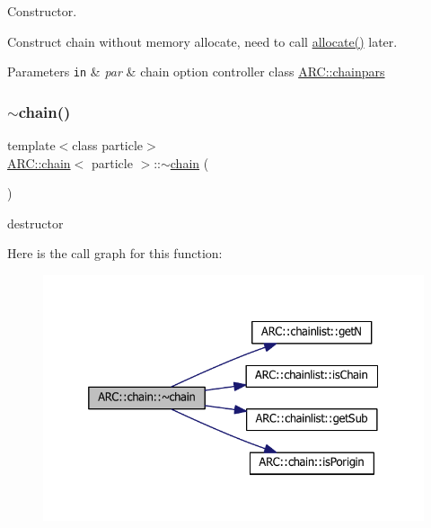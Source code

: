 Constructor. 

Construct chain without memory allocate, need to call \hyperlink{classARC_1_1chain_ad0abd7b957e9d88ad2f1823f06d28a4a}{allocate()} later. 
\begin{DoxyParams}[1]{Parameters}
\mbox{\tt in}  & {\em par} & chain option controller class \hyperlink{classARC_1_1chainpars}{A\+R\+C\+::chainpars} \\
\hline
\end{DoxyParams}
\hypertarget{classARC_1_1chain_a3467a68afb2daebec6c57899897a461c}{}\label{classARC_1_1chain_a3467a68afb2daebec6c57899897a461c} 
\subsubsection{\texorpdfstring{$\sim$chain()}{~chain()}}
{\footnotesize\ttfamily template$<$class particle$>$ \\
\hyperlink{classARC_1_1chain}{A\+R\+C\+::chain}$<$ particle $>$\+::$\sim$\hyperlink{classARC_1_1chain}{chain} (\begin{DoxyParamCaption}{ }\end{DoxyParamCaption})\hspace{0.3cm}{\ttfamily [inline]}}



destructor 

Here is the call graph for this function\+:
\nopagebreak
\begin{figure}[H]
\begin{center}
\leavevmode
\includegraphics[width=332pt]{classARC_1_1chain_a3467a68afb2daebec6c57899897a461c_cgraph}
\end{center}
\end{figure}


